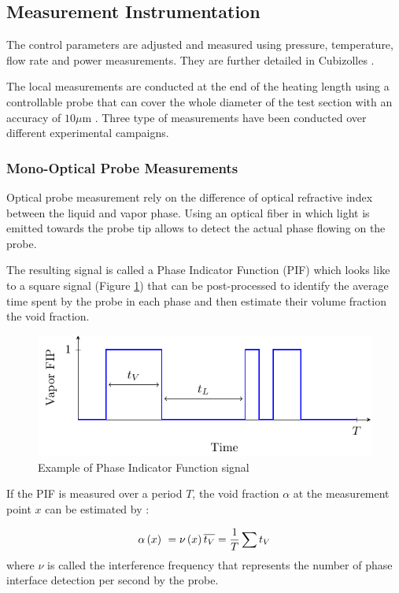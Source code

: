 \subsection{Measurement Instrumentation}

The control parameters are adjusted and measured using pressure, temperature, flow rate and power measurements. They are further detailed in Cubizolles \cite{Cubizolles_1996}.

\npar

The local measurements are conducted at the end of the heating length using a controllable probe that can cover the whole diameter of the test section with an accuracy of $10 \mu$m . Three type of measurements have been conducted over different experimental campaigns.

\subsubsection{Mono-Optical Probe Measurements}


Optical probe measurement rely on the difference of optical refractive index between the liquid and vapor phase. Using an optical fiber in which light is emitted towards the probe tip allows to detect the actual phase flowing on the probe. 

\npar

The resulting signal is called a Phase Indicator Function (PIF) which looks like to a square signal (Figure \ref{fig:FIP}) that can be post-processed to identify the average time spent by the probe in each phase and then estimate their volume fraction \eg the void fraction. 


\begin{figure}[!h]
\centering
\includegraphics[width=0.65\linewidth]{img/DEBORA/FIP.pdf}
\caption{Example of Phase Indicator Function signal}
\label{fig:FIP}
\end{figure}



If the PIF is measured over a period $T$, the void fraction $\alpha$ at the measurement point $x$ can be estimated by :


\begin{equation}
\alpha\left( x \right)\ = \nu\left( x \right) \overline{t_{V}} = \frac{1}{T} \sum t_{V}
\end{equation}
where $\nu$ is called the interference frequency that represents the number of phase interface detection per second by the probe.

